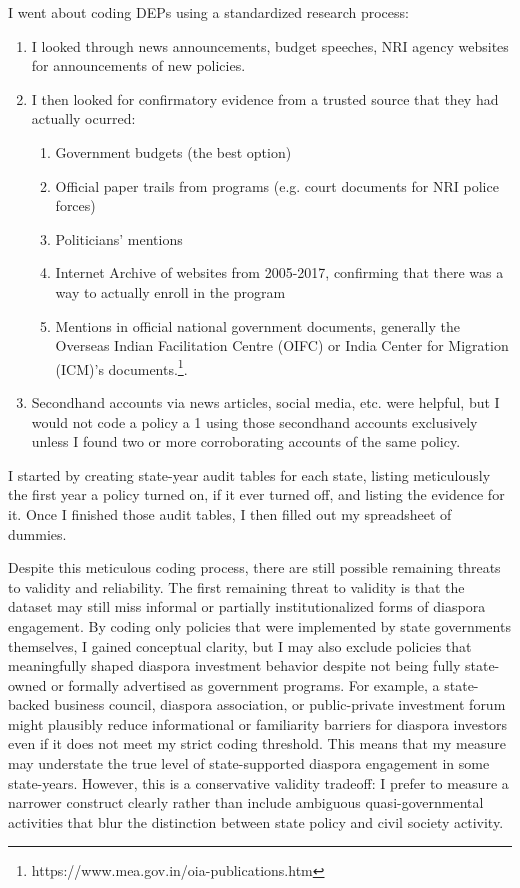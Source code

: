\documentclass[12pt]{article}
\begin{document}
            I went about coding DEPs using a standardized research process:
            \begin{enumerate}
                \item I looked through news announcements, budget speeches, NRI agency websites for announcements of new policies.
                \item I then looked for confirmatory evidence from a trusted source that they had actually ocurred:
                \begin{enumerate}
                    \item Government budgets (the best option)
                    \item Official paper trails from programs (e.g. court documents for NRI police forces)
                    \item Politicians' mentions
                    \item Internet Archive of websites from 2005-2017, confirming that there was a way to actually enroll in the program
                    \item Mentions in official national government documents, generally the Overseas Indian Facilitation Centre (OIFC) or India Center for Migration (ICM)'s documents.\footnote{https://www.mea.gov.in/oia-publications.htm}.
                \end{enumerate}
            \item Secondhand accounts via news articles, social media, etc. were helpful, but I would not code a policy a 1 using those secondhand accounts exclusively unless I found two or more corroborating accounts of the same policy.
            \end{enumerate}

I started by creating state-year audit tables for each state, listing meticulously the first year a policy turned on, if it ever turned off, and listing the evidence for it. Once I finished those audit tables, I then filled out my spreadsheet of dummies.

Despite this meticulous coding process, there are still possible remaining threats to validity and reliability. The first remaining threat to validity is that the dataset may still miss informal or partially institutionalized forms of diaspora engagement. By coding only policies that were implemented by state governments themselves, I gained conceptual clarity, but I may also exclude policies that meaningfully shaped diaspora investment behavior despite not being fully state-owned or formally advertised as government programs. For example, a state-backed business council, diaspora association, or public-private investment forum might plausibly reduce informational or familiarity barriers for diaspora investors even if it does not meet my strict coding threshold. This means that my measure may understate the true level of state-supported diaspora engagement in some state-years. However, this is a conservative validity tradeoff: I prefer to measure a narrower construct clearly rather than include ambiguous quasi-governmental activities that blur the distinction between state policy and civil society activity.
\end{document}

